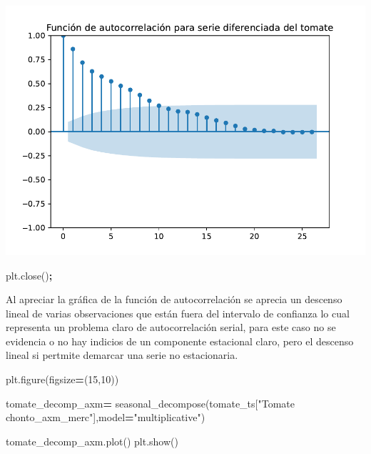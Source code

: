 \documentclass[
]{book}
\newenvironment{Shaded}{\begin{snugshade}}{\end{snugshade}}
\newcommand{\DecValTok}[1]{\textcolor[rgb]{0.00,0.00,0.81}{#1}}
\newcommand{\NormalTok}[1]{#1}
\newcommand{\OperatorTok}[1]{\textcolor[rgb]{0.81,0.36,0.00}{\textbf{#1}}}
\newcommand{\StringTok}[1]{\textcolor[rgb]{0.31,0.60,0.02}{#1}}
\begin{document}
\includegraphics{bookdown-demo_files/figure-latex/unnamed-chunk-77-47.pdf}

\begin{Shaded}
\begin{Highlighting}[]
\NormalTok{plt.close()}\OperatorTok{;}
\end{Highlighting}
\end{Shaded}

Al apreciar la gráfica de la función de autocorrelación se aprecia un descenso lineal de varias observaciones que están fuera del intervalo de confianza lo cual representa un problema claro de autocorrelación serial, para este caso no se evidencia o no hay indicios de un componente estacional claro, pero el descenso lineal si pertmite demarcar una serie no estacionaria.

\begin{Shaded}
\begin{Highlighting}[]

\NormalTok{plt.figure(figsize}\OperatorTok{=}\NormalTok{(}\DecValTok{15}\NormalTok{,}\DecValTok{10}\NormalTok{))}

\NormalTok{tomate\_decomp\_axm}\OperatorTok{=}\NormalTok{ seasonal\_decompose(tomate\_ts[}\StringTok{"Tomate chonto\_axm\_merc"}\NormalTok{],model}\OperatorTok{=}\StringTok{"multiplicative"}\NormalTok{)}

\NormalTok{tomate\_decomp\_axm.plot()}
\NormalTok{plt.show()}
\end{Highlighting}
\end{Shaded}
\end{document}
